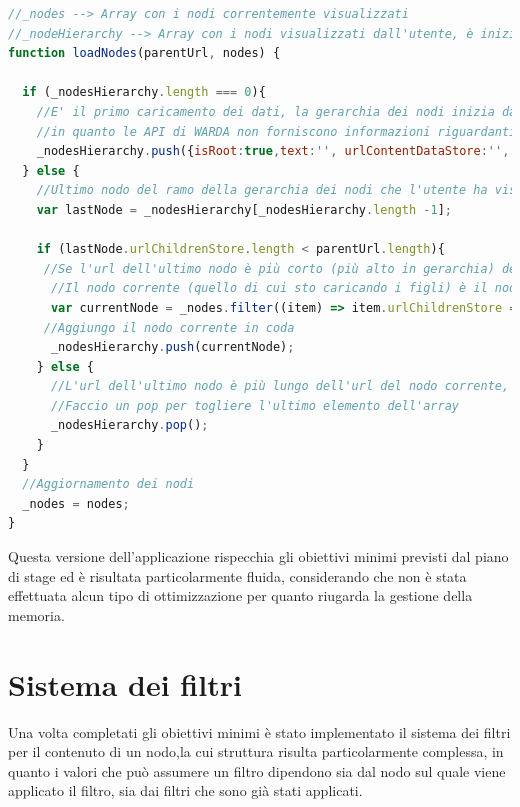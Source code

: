 \begin{lstlisting}[language=JavaScript, caption=NodesStore - Caricamento dei nodi]
//_nodes --> Array con i nodi correntemente visualizzati
//_nodeHierarchy --> Array con i nodi visualizzati dall'utente, è inizializzato come array vuoto
function loadNodes(parentUrl, nodes) {

  if (_nodesHierarchy.length === 0){
    //E' il primo caricamento dei dati, la gerarchia dei nodi inizia da un nodo "finto" che funziona da radice
    //in quanto le API di WARDA non forniscono informazioni riguardanti il nodo radice di una gallery
    _nodesHierarchy.push({isRoot:true,text:'', urlContentDataStore:'', urlChildrenStore:''});
  } else {
    //Ultimo nodo del ramo della gerarchia dei nodi che l'utente ha visualizzato
    var lastNode = _nodesHierarchy[_nodesHierarchy.length -1];

    if (lastNode.urlChildrenStore.length < parentUrl.length){
     //Se l'url dell'ultimo nodo è più corto (più alto in gerarchia) dell'url del nodo corrente, vuol dire che l'utente sta scendendo lungo il ramo
      //Il nodo corrente (quello di cui sto caricando i figli) è il nodo che ha urlContentDataStore == parentUrl e che si trova correntemente in memoria
      var currentNode = _nodes.filter((item) => item.urlChildrenStore === parentUrl)[0];
     //Aggiungo il nodo corrente in coda
      _nodesHierarchy.push(currentNode);
    } else {
      //L'url dell'ultimo nodo è più lungo dell'url del nodo corrente, vuol dire che sto risalendo lungo il ramo
      //Faccio un pop per togliere l'ultimo elemento dell'array
      _nodesHierarchy.pop();
    }
  }
  //Aggiornamento dei nodi
  _nodes = nodes;
}
\end{lstlisting}

Questa versione dell'applicazione rispecchia gli obiettivi minimi previsti dal piano di stage ed è risultata particolarmente fluida, considerando che non è stata effettuata alcun tipo di ottimizzazione per quanto riugarda la gestione della memoria.

\section{Sistema dei filtri}

Una volta completati gli obiettivi minimi è stato implementato il sistema dei filtri per il contenuto di un nodo,la cui struttura risulta particolarmente complessa, in quanto i valori che può assumere un filtro dipendono sia dal nodo sul quale viene applicato il filtro, sia dai filtri che sono già stati applicati.

